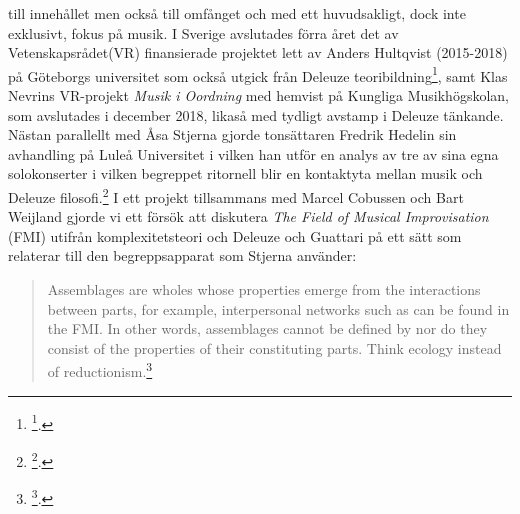 \documentclass[11pt]{article}
\begin{document}
till innehållet men också till omfånget och med ett huvudsakligt, dock
inte exklusivt, fokus på musik. I Sverige avslutades förra året det av
Vetenskapsrådet(VR) finansierade projektet lett av Anders Hultqvist
(2015-2018) på Göteborgs universitet som också utgick från Deleuze
teoribildning\footnote{\footcite{hultqvist2019}.}, samt Klas Nevrins VR-projekt \emph{Musik i Oordning}
med hemvist på Kungliga Musikhögskolan, som avslutades i december 2018,
likaså med tydligt avstamp i Deleuze tänkande. Nästan parallellt med Åsa
Stjerna gjorde tonsättaren Fredrik Hedelin sin avhandling på Luleå
Universitet i vilken han utför en analys av tre av sina egna
solokonserter i vilken begreppet ritornell blir en kontaktyta mellan
musik och Deleuze filosofi.\footnote{\footcite{Hedelin2017}.} I ett projekt tillsammans med Marcel
Cobussen och Bart Weijland gjorde vi ett försök att diskutera \emph{The Field
of Musical Improvisation} (FMI) utifrån komplexitetsteori och Deleuze
och Guattari på ett sätt som relaterar till den begreppsapparat som
Stjerna använder:

\begin{quote}
Assemblages are wholes whose properties emerge from the interactions
between parts, for example, interpersonal networks such as can be
found in the FMI. In other words, assemblages cannot be defined by nor
do they consist of the properties of their constituting parts. Think
ecology instead of reductionism.\footnote{\footcite{frisk-cobussen09}.}
\end{quote}
\end{document}
